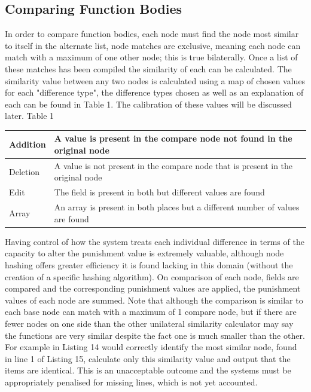 \documentclass[jou,apacite]{apa6}
\begin{document}
\subsection{Comparing Function Bodies}
In order to compare function bodies, each node must find the node most similar to itself in the alternate list, node matches are exclusive, meaning each node can match with a maximum of one other node; this is true bilaterally. Once a list of these matches has been compiled the similarity of each can be calculated. The similarity value between any two nodes is calculated using a map of chosen values for each "difference type", the difference types chosen as well as an explanation of each can be found in Table 1.  The calibration of these values will be discussed later.
\newline\newline
Table 1
\begin{tabular}{l|p{50mm}}
  \hline
  Addition & A value is present in the compare
    node not found in the original node\\
  \hline
  Deletion & A value is not present in the compare node that is present in the original node\\
  \hline
  Edit & The field is present in both but different values are found\\
  \hline
  Array & An array is present in both places but a different number of values are found\\
  \hline
\end{tabular}
\newline\newline

Having control of how the system treats each individual difference in terms of the capacity to alter the punishment value is extremely valuable, although node hashing offers greater efficiency it is found lacking in this domain (without the creation of a specific hashing algorithm). On comparison of each node, fields are compared and the corresponding punishment values are applied, the punishment values of each node are summed. Note that although the comparison is similar to each base node can match with a maximum of 1 compare node, but if there are fewer nodes on one side than the other unilateral similarity calculator may say the functions are very similar despite the fact one is much smaller than the other. For example in Listing 14 would correctly identify the most similar node, found in line 1 of Listing 15, calculate only this similarity value and output that the items are identical. This is an unacceptable outcome and the systems must be appropriately penalised for missing lines, which is not yet accounted.
\end{document}
